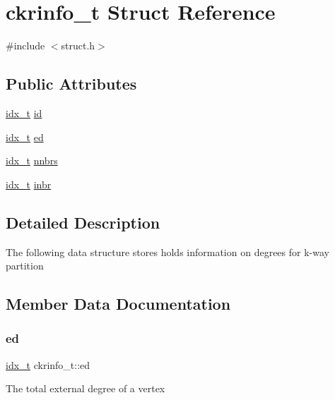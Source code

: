 \hypertarget{a00718}{}\section{ckrinfo\+\_\+t Struct Reference}
\label{a00718}


{\ttfamily \#include $<$struct.\+h$>$}

\subsection*{Public Attributes}
\begin{DoxyCompactItemize}
\item 
\hyperlink{a00876_aaa5262be3e700770163401acb0150f52}{idx\+\_\+t} \hyperlink{a00718_a6d1da388f70555f25dc90fdcc011bb9b}{id}
\item 
\hyperlink{a00876_aaa5262be3e700770163401acb0150f52}{idx\+\_\+t} \hyperlink{a00718_a57270f8839a5146d9342569f12865e57}{ed}
\item 
\hyperlink{a00876_aaa5262be3e700770163401acb0150f52}{idx\+\_\+t} \hyperlink{a00718_a73fbc8555b843b3fd414ac0a9ec244f1}{nnbrs}
\item 
\hyperlink{a00876_aaa5262be3e700770163401acb0150f52}{idx\+\_\+t} \hyperlink{a00718_aca4e2d97adbc1b6401b4ee8acba70770}{inbr}
\end{DoxyCompactItemize}


\subsection{Detailed Description}
The following data structure stores holds information on degrees for k-\/way partition 

\subsection{Member Data Documentation}
\mbox{\label{a00718_a57270f8839a5146d9342569f12865e57}} 
\subsubsection{\texorpdfstring{ed}{ed}}
{\footnotesize\ttfamily \hyperlink{a00876_aaa5262be3e700770163401acb0150f52}{idx\+\_\+t} ckrinfo\+\_\+t\+::ed}

The total external degree of a vertex \mbox{\label{a00718_a6d1da388f70555f25dc90fdcc011bb9b}} 

